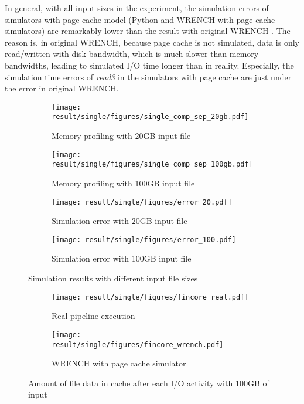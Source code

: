 \documentclass[conference]{IEEEtran}
\begin{document}
			In general, with all input sizes in the experiment, the simulation errors 
			of simulators with page cache model (Python and WRENCH with page cache simulators) 
			are remarkably lower than the result with original WRENCH . 
			The reason is, in original WRENCH, because page cache is not simulated, 
			data is only read/written with disk bandwidth, which is much slower 
			than memory bandwidths, leading to simulated I/O time longer than in reality.
			Especially, the simulation time errors of \textit{read3} in the simulators 
			with page cache are just under the error in original WRENCH. 
		
			\begin{figure*}
			\begin{subfigure}{\columnwidth}
				\centering
   				\texttt{[image: result/single/figures/single\_comp\_sep\_20gb.pdf]}
   				\caption{Memory profiling with 20GB input file}	\label{fig:single_memprof_20gb}
			\end{subfigure}	
			\begin{subfigure}{\columnwidth}
				\centering
   				\texttt{[image: result/single/figures/single\_comp\_sep\_100gb.pdf]}
   				\caption{Memory profiling with 100GB input file}	\label{fig:single_memprof_100gb}
			\end{subfigure}	
			\begin{subfigure}{\columnwidth}
				\centering
   				\texttt{[image: result/single/figures/error\_20.pdf]}
   				\caption{Simulation error with 20GB input file}	\label{fig:single_error_20}
			\end{subfigure}		
			\begin{subfigure}{\columnwidth}
				\centering
   				\texttt{[image: result/single/figures/error\_100.pdf]}
   				\caption{Simulation error with 100GB input file}	\label{fig:single_error_100}
			\end{subfigure}	
			\caption{Simulation results with different input file sizes}
			\label{fig:single_results}
			\end{figure*}			
			
			
			\begin{figure*}
			\begin{subfigure}{\columnwidth}
				\centering
   				\texttt{[image: result/single/figures/fincore\_real.pdf]}
   				\caption{Real pipeline execution}	
   				\label{fig:fincore_real}
			\end{subfigure}	
			\begin{subfigure}{\columnwidth}
				\centering
   				\texttt{[image: result/single/figures/fincore\_wrench.pdf]}
   				\caption{WRENCH with page cache simulator}	
   				\label{fig:fincore_wrench}
			\end{subfigure}	
			\caption{Amount of file data in cache after each I/O activity with 100GB of input}
			\label{fig:fincore}
			\end{figure*}			
\end{document}

